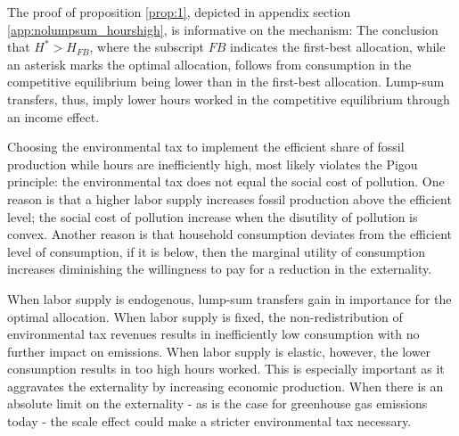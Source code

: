 
 
The proof of proposition \ref{prop:1}, depicted in appendix section \ref{app:nolumpsum_hourshigh}, is informative on the mechanism: The conclusion that $H^*>H_{FB}$, where the subscript $FB$ indicates the first-best allocation, while an asterisk marks the optimal allocation,  follows from consumption in the competitive equilibrium being lower than in the first-best allocation. Lump-sum transfers, thus, imply lower hours worked in the competitive equilibrium through an income effect.


Choosing the environmental tax to implement the efficient share of fossil production while hours are inefficiently high, most likely  violates the Pigou principle: the environmental tax does not equal the social cost of pollution. One reason is that a higher labor supply increases fossil production above the efficient level; the social cost of pollution increase when the disutility of pollution is convex. Another reason is that household consumption deviates from the efficient level of consumption, if it is below, then the marginal utility of consumption increases diminishing the willingness to pay for a reduction in the externality. 

When labor supply is endogenous, lump-sum transfers gain in importance for the optimal allocation. When labor supply is fixed, the non-redistribution of environmental tax revenues results in inefficiently low consumption with no further impact on emissions. When labor supply is elastic, however, the lower consumption results in too high hours worked. This is especially important as it aggravates the externality by increasing economic production. When there is an absolute limit on the externality - as is the case for greenhouse gas emissions today - the scale effect could make a stricter environmental tax necessary. 

